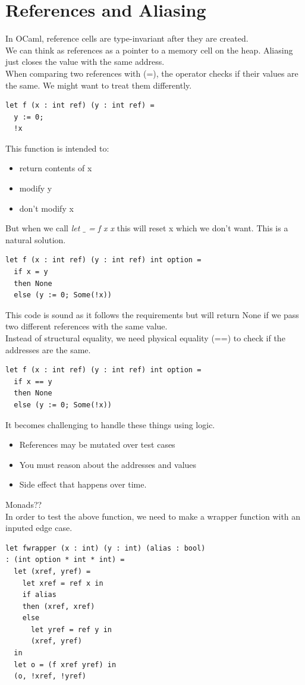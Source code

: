 \section{References and Aliasing}
In OCaml, reference cells are type-invariant after they are created. 
\\
We can think as references as a pointer to a memory cell on the heap. Aliasing just closes the value with the same address.
\\
When comparing two references with (=), the operator checks if their values are the same. We might want to treat them differently.
\begin{lstlisting}
let f (x : int ref) (y : int ref) =
  y := 0;
  !x
\end{lstlisting}
This function is intended to:
\begin{itemize}
  \item return contents of x
  \item modify y
  \item don't modify x
\end{itemize}
But when we call \textit{let $\_$ = f x x} this will reset x which we don't want. This is a natural solution.
\begin{lstlisting}
let f (x : int ref) (y : int ref) int option =
  if x = y
  then None
  else (y := 0; Some(!x))
\end{lstlisting}
This code is sound as it follows the requirements but will return None if we pass two different references with the same value. 
\\
Instead of structural equality, we need physical equality (==) to check if the addresses are the same.
\begin{lstlisting}
let f (x : int ref) (y : int ref) int option =
  if x == y
  then None
  else (y := 0; Some(!x))
\end{lstlisting}
It becomes challenging to handle these things using logic.
\begin{itemize}
  \item References may be mutated over test cases
  \item You must reason about the addresses and values
  \item Side effect that happens over time.
\end{itemize}
Monads??
\\
In order to test the above function, we need to make a wrapper function with an inputed edge case.
\begin{lstlisting}
let fwrapper (x : int) (y : int) (alias : bool) 
: (int option * int * int) =
  let (xref, yref) =
    let xref = ref x in 
    if alias
    then (xref, xref)
    else 
      let yref = ref y in
      (xref, yref)
  in
  let o = (f xref yref) in
  (o, !xref, !yref)
\end{lstlisting}
